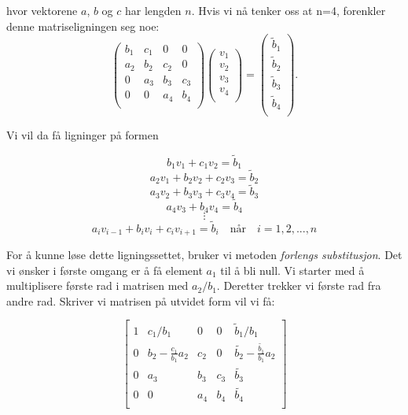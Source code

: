 \documentclass{article}
\begin{document}
hvor vektorene $a$, $b$ og $c$ har lengden $n$. Hvis vi nå tenker oss at n=4, forenkler denne matriseligningen seg noe:
\begin{equation}
    \left(\begin{array}{cccccc}
                           b_1& c_1 & 0 &0 \\
                           a_2 & b_2 & c_2 &0 \\
                           0 & a_3 & b_3 & c_3 \\
                           0 & 0 & a_4 &  b_4  \\
                      \end{array} \right)\left(\begin{array}{c}
                           v_1\\
                           v_2\\
                           v_3\\
                          v_4  \\
                      \end{array} \right)
  =\left(\begin{array}{c}
                           \tilde{b}_1\\
                           \tilde{b}_2\\
                        \tilde{b}_3\\
                        \tilde{b}_4\\
                      \end{array} \right).
\end{equation}

Vi vil da få ligninger på formen

\[b_1v_1 + c_1v_2 = \tilde{b}_1\]
\[a_2v_1 + b_2v_2 + c_2v_3 = \tilde{b}_2\]
\[a_3v_2 + b_3v_3 + c_3v_4 = \tilde{b}_3\]
\[a_4v_3 + b_4v_4 = \tilde{b}_4\]
\[\vdots\]
\begin{equation}
a_iv_{i-1} + b_iv_i + c_iv_{i+1} = \tilde{b}_i \quad \textrm{når} \quad i = 1,2,...,n
\end{equation}

For å kunne løse dette ligningssettet, bruker vi metoden \textit{forlengs substitusjon}. Det vi ønsker i første omgang er å få element $a_1$ til å bli null. Vi starter med å multiplisere første rad i matrisen med $a_2/b_1$. Deretter trekker vi første rad fra andre rad. Skriver vi matrisen på utvidet form vil vi få:

\[
\left[
\begin{array}{cccc|c}
1 & c_1/b_1 & 0 & 0 & \tilde{b}_1/b_1 \\
 0 & b_2 - \frac{c_1}{b_1}a_2  &c_2 &0 & \tilde{b_2} - \frac{\tilde{b_1}}{b_1}a_2\\
  0 & a_3 & b_3 & c_3 & \tilde{b_3}\\
  0 & 0 & a_4 & b_4 & \tilde{b_4}\\
\end{array}
\right]
\]
\end{document}
